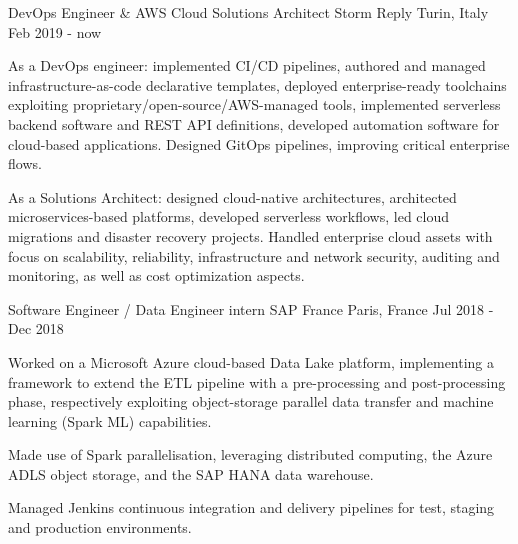 

\begin{cventries}


  \cventry
    {DevOps Engineer \& AWS Cloud Solutions Architect} %
    {Storm Reply} %
    {Turin, Italy} %
    {Feb 2019 - now} %
    {
        \begin{cvitems} %
\item As a DevOps engineer: implemented CI/CD pipelines, authored and managed infrastructure-as-code declarative templates, deployed enterprise-ready toolchains exploiting proprietary/open-source/AWS-managed tools, implemented serverless backend software and REST API definitions, developed automation software for cloud-based applications. Designed GitOps pipelines, improving critical enterprise flows.
\item As a Solutions Architect: designed cloud-native architectures, architected microservices-based platforms, developed serverless workflows, led cloud migrations and disaster recovery projects. Handled enterprise cloud assets with focus on scalability, reliability, infrastructure and network security, auditing and monitoring, as well as cost optimization aspects.
        \end{cvitems}
    }

  \cventry
    {Software Engineer / Data Engineer intern} %
    {SAP France} %
    {Paris, France} %
    {Jul 2018 - Dec 2018} %
    {
      \begin{cvitems} %
\item Worked on a Microsoft Azure cloud-based Data Lake platform, implementing a framework to extend the ETL pipeline with a pre-processing and post-processing phase, respectively exploiting object-storage parallel data transfer and machine learning (Spark ML) capabilities.
\item Made use of Spark parallelisation, leveraging distributed computing, the Azure ADLS object storage, and the SAP HANA data warehouse.
\item Managed Jenkins continuous integration and delivery pipelines for test, staging and production environments.
      \end{cvitems}
    }
\end{cventries}
